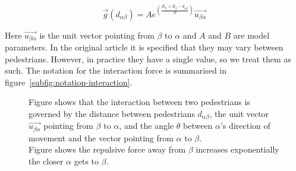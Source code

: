\begin{equation}
    \overrightarrow{g}
    \left(
        d_{\alpha \beta}
    \right)
    =
    A e^{ \left(
        \frac{ R_\alpha + R_\beta - d_{\alpha \beta}}
             {B}
    \right)}
    \overrightarrow{u_{\beta \alpha}}
    \label{re}	
\end{equation}

Here $\overrightarrow{u_{\beta \alpha}}$ is the unit vector pointing from
$\beta$ to $\alpha$ and $A$ and $B$ are model parameters. In the original
article it is specified that they may vary between pedestrians. However, in
practice they have a single value, so we treat them as such. The notation for
the interaction force is summarised in
figure~\ref{subfig:notation-interaction}.

\begin{figure}[h]
    \centering
    \caption[Interaction between two
    pedestrians.]{Figure  shows that the interaction between two pedestrians is governed by the distance between pedestrians $d_{\alpha \beta}$, the unit vector $\overrightarrow{u_{\beta \alpha}}$ pointing from $\beta$ to $\alpha$, and the angle $\theta$ between $\alpha$'s direction of movement and the vector pointing from $\alpha$ to
    $\beta$.\\
Figure  shows the repulsive force away from $\beta$ increases exponentially the closer $\alpha$ gets to $\beta$.} \label{fig:pedestrian-interaction}
\end{figure}

